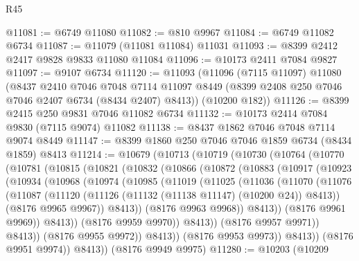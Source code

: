 \begin{lexlean}{R45}
\begin{coremodule}
{@11081 := @6749 @11080
@11082 := @810 @9967
@11084 := @6749 @11082 @6734
@11087 := @11079 (@11081 @11084) @11031
@11093 := @8399 @2412 @2417 @9828 @9833 @11080 @11084
@11096 := @10173 @2411 @7084 @9827
@11097 := @9107 @6734
@11120 := @11093
    (@11096
      (@7115 @11097)
      @11080
      (@8437
        @2410
        @7046
        @7048
        @7114
        @11097
        @8449
        (@8399 @2408 @250 @7046 @7046 @2407 @6734 (@8434 @2407) @8413))
      (@10200 @182))
@11126 := @8399 @2415 @250 @9831 @7046 @11082 @6734
@11132 := @10173 @2414 @7084 @9830 (@7115 @9074) @11082
@11138 := @8437 @1862 @7046 @7048 @7114 @9074 @8449
@11147 := @8399 @1860 @250 @7046 @7046 @1859 @6734 (@8434 @1859) @8413
@11214 := @10679
    (@10713
      (@10719
        (@10730
          (@10764
            (@10770
              (@10781
                (@10815
                  (@10821
                    (@10832
                      (@10866
                        (@10872
                          (@10883
                            (@10917
                              (@10923
                                (@10934
                                  (@10968
                                    (@10974
                                      (@10985
                                        (@11019
                                          (@11025
                                            (@11036
                                              (@11070
                                                (@11076
                                                  (@11087
                                                    (@11120
                                                      (@11126
                                                        (@11132 (@11138 @11147) (@10200 @24))
                                                        @8413))
                                                    (@8176 @9965 @9967))
                                                  @8413))
                                              (@8176 @9963 @9968))
                                            @8413))
                                        (@8176 @9961 @9969))
                                      @8413))
                                  (@8176 @9959 @9970))
                                @8413))
                            (@8176 @9957 @9971))
                          @8413))
                      (@8176 @9955 @9972))
                    @8413))
                (@8176 @9953 @9973))
              @8413))
          (@8176 @9951 @9974))
        @8413))
    (@8176 @9949 @9975)
@11280 := @10203
    (@10209
}
\end{coremodule}
\end{lexlean}
